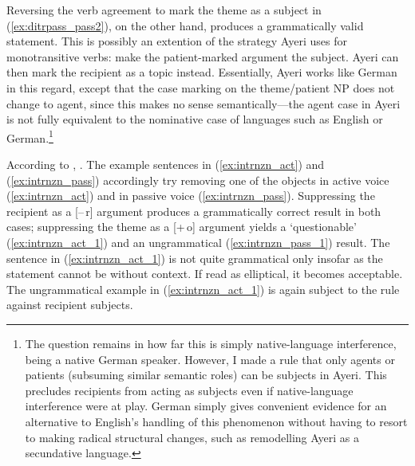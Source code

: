 Reversing the verb agreement to mark the theme as a subject in
(\ref{ex:ditrpass_pass2}), on the other hand, produces a grammatically valid
statement. This is possibly an extention of the strategy Ayeri uses for
monotransitive verbs: make the patient-marked argument the subject. Ayeri can
then mark the recipient as a topic instead. Essentially, Ayeri works like
German in this regard, except that the case marking on the theme/patient NP
does not change to agent, since this makes no sense semantically---the agent
case in Ayeri is not fully equivalent to the nominative case of languages such
as English or German.\footnote{The question remains in how far this is simply
native-language interference, being a native German speaker. However, I made a
rule that only agents or patients (subsuming similar semantic roles) can be
subjects in Ayeri. This precludes recipients from acting as subjects even if
native-language interference were at play. German simply gives convenient
evidence for an alternative to English's handling of this phenomenon without
having to resort to making radical structural changes, such as remodelling
Ayeri as a secundative language.}

According to \citet{bresnan2016}, . The example sentences in
(\ref{ex:intrnzn_act}) and (\ref{ex:intrnzn_pass}) accordingly try removing one
of the objects in active voice (\ref{ex:intrnzn_act}) and in passive voice
(\ref{ex:intrnzn_pass}). Suppressing the recipient as a [–\,r] argument
produces a grammatically correct result in both cases; suppressing the theme as
a [+\,o] argument yields a `questionable' (\ref{ex:intrnzn_act_1}) and an
ungrammatical (\ref{ex:intrnzn_pass_1}) result. The sentence in
(\ref{ex:intrnzn_act_1}) is not quite grammatical only insofar as the statement
cannot be without context. If read as elliptical, it becomes acceptable. The
ungrammatical example in (\ref{ex:intrnzn_act_1}) is again subject to the
rule against recipient subjects.

